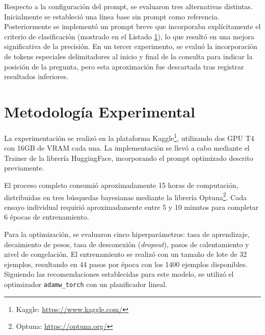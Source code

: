 Respecto a la configuración del prompt, se evaluaron tres alternativas distintas. Inicialmente se estableció una línea base sin prompt como referencia. Posteriormente se implementó un prompt breve que incorporaba explícitamente el criterio de clasificación (mostrado en el Listado \ref{}), lo que resultó en una mejora significativa de la precisión. En un tercer experimento, se evaluó la incorporación de tokens especiales delimitadores al inicio y final de la consulta para indicar la posición de la pregunta, pero esta aproximación fue descartada tras registrar resultados inferiores.

\section{Metodología Experimental}

La experimentación se realizó en la plataforma Kaggle\footnote{Kaggle: \url{https://www.kaggle.com/}}, utilizando dos GPU T4 con 16GB de VRAM cada una. La implementación se llevó a cabo mediante el Trainer de la librería HuggingFace, incorporando el prompt optimizado descrito previamente.

El proceso completo consumió aproximadamente 15 horas de computación, distribuidas en tres búsquedas bayesianas mediante la librería Optuna\footnote{Optuna: \url{https://optuna.org/}}. Cada ensayo individual requirió aproximadamente entre 5 y 10 minutos para completar 6 épocas de entrenamiento.

Para la optimización, se evaluaron cinco hiperparámetros: tasa de aprendizaje, decaimiento de pesos, tasa de desconexión (\textit{dropout}), pasos de calentamiento y nivel de congelación. El entrenamiento se realizó con un tamaño de lote de 32 ejemplos, resultando en 44 pasos por época con los 1400 ejemplos disponibles. Siguiendo las recomendaciones establecidas para este modelo, se utilizó el optimizador \texttt{adamw\_torch} con un planificador lineal.

